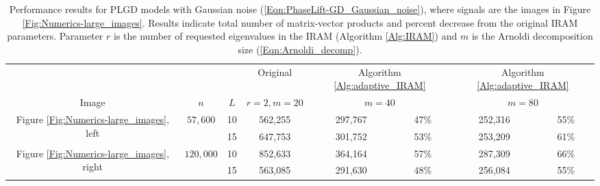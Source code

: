 \begin{table}[H]
\centering
\begin{tabular}{ |ccc|c|cc|cc| }
 \hline
			&&&  Original
			&  \multicolumn{2}{c|}{Algorithm \ref{Alg:adaptive_IRAM}}
			&	\multicolumn{2}{c|}{Algorithm \ref{Alg:adaptive_IRAM}}	\\
Image & $n$ & $L$ & $r=2, m=20$	& \multicolumn{2}{c|}{$m=40$}  & \multicolumn{2}{c|}{$m=80$}   \\
 \hline
	\multirow{2}{*}{Figure \ref{Fig:Numerics-large_images}, left} &
   \multirow{2}{*}{$57,600$} &  10 &  562,255  &  297,767 & 47\% &  252,316 & 55\% \\ 
  &&  15 &  647,753  &  301,752 & 53\% &  253,209 & 61\% \\ 
	\multirow{2}{*}{Figure \ref{Fig:Numerics-large_images}, right}  &   
     \multirow{2}{*}{$120,000$} &  10 &  852,633  &  364,164 & 57\% &  287,309 & 66\% \\ 
  &&  15 &  563,085  &  291,630 & 48\% &  256,084 & 55\% \\ 
 \hline
\end{tabular}
\caption{
Performance results for PLGD models with Gaussian noise (\ref{Eqn:PhaseLift-GD_Gaussian_noise}), where signals are the images in Figure \ref{Fig:Numerics-large_images}.
Results indicate total number of matrix-vector products and percent decrease from the original IRAM parameters.
Parameter $r$ is the number of requested eigenvalues in the IRAM (Algorithm \ref{Alg:IRAM}) and $m$ is the Arnoldi decomposition size (\ref{Eqn:Arnoldi_decomp}).
	} 
	\label{Tab:Numerics-ada_vs_orig_large_images}
\end{table}



